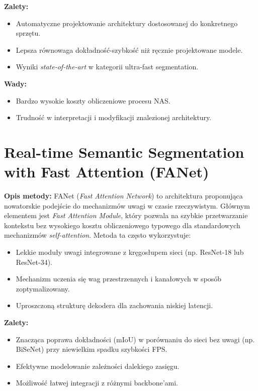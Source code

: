 \textbf{Zalety:}
\begin{itemize}
    \item Automatyczne projektowanie architektury dostosowanej do konkretnego sprzętu.
    \item Lepsza równowaga dokładność-szybkość niż ręcznie projektowane modele.
    \item Wyniki \textit{state-of-the-art} w kategorii ultra-fast segmentation.
\end{itemize}

\textbf{Wady:}
\begin{itemize}
    \item Bardzo wysokie koszty obliczeniowe procesu NAS.
    \item Trudność w interpretacji i modyfikacji znalezionej architektury.
\end{itemize}


\section{Real-time Semantic Segmentation with Fast Attention (FANet)}
\textbf{Opis metody:}
FANet (\textit{Fast Attention Network}) to architektura proponująca nowatorskie podejście do mechanizmów uwagi w czasie rzeczywistym. Głównym elementem jest \textit{Fast Attention Module}, który pozwala na szybkie przetwarzanie kontekstu bez wysokiego kosztu obliczeniowego typowego dla standardowych mechanizmów \textit{self-attention}. Metoda ta często wykorzystuje:
\begin{itemize}
    \item Lekkie moduły uwagi integrowane z kręgosłupem sieci (np. ResNet-18 lub ResNet-34).
    \item Mechanizm uczenia się wag przestrzennych i kanałowych w sposób zoptymalizowany.
    \item Uproszczoną strukturę dekodera dla zachowania niskiej latencji.
\end{itemize}

\textbf{Zalety:}
\begin{itemize}
    \item Znacząca poprawa dokładności (mIoU) w porównaniu do sieci bez uwagi (np. BiSeNet) przy niewielkim spadku szybkości FPS.
    \item Efektywne modelowanie zależności dalekiego zasięgu.
    \item Możliwość łatwej integracji z różnymi backbone'ami.
\end{itemize}

